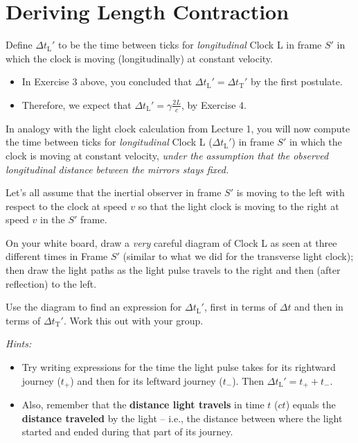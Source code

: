 \documentclass[11pt, letterpaper, openany]{book}
\newenvironment{exercise}[1][Exercise]{%
  \tcolorbox[blanker, breakable, left=1em,
    before skip=1em, after skip=1em,
    borderline west={3pt}{0pt}{PhysNavy},
    colback=PhysCream,
    before upper={\textcolor{PhysNavy}{\sffamily\bfseries #1:}\space}
  ]%
}{%
  \endtcolorbox%
}
\begin{document}
\section{Deriving Length Contraction}

Define $\Delta t_{\text{L}}'$ to be the time between ticks for \textit{longitudinal} Clock L in frame $S'$ in which the clock is moving (longitudinally) at constant velocity.

\begin{itemize}
    \item In Exercise 3 above, you concluded that $\Delta t_{\text{L}}' = \Delta t_{\text{T}}'$ by the first postulate.
    \item Therefore, we expect that $\Delta t_{\text{L}}' = \gamma \frac{2L}{c}$, by Exercise 4.
\end{itemize}

In analogy with the light clock calculation from Lecture 1, you will now compute the time between ticks for \textit{longitudinal} Clock L ($\Delta t_{\text{L}}'$) in frame $S'$ in which the clock is moving at constant velocity, \textit{under the assumption that the observed longitudinal distance between the mirrors stays fixed.}

Let's all assume that the inertial observer in frame $S'$ is moving to the left with respect to the clock at speed $v$ so that the light clock is moving to the right at speed $v$ in the $S'$ frame.

\begin{exercise}[Exercise 5]
On your white board, draw a \textit{very} careful diagram of Clock L as seen at three different times in Frame $S'$ (similar to what we did for the transverse light clock); then draw the light paths as the light pulse travels to the right and then (after reflection) to the left.

Use the diagram to find an expression for $\Delta t_{\text{L}}'$, first in terms of $\Delta t$ and then in terms of $\Delta t_{\text{T}}'$. Work this out with your group.

\textit{Hints:}
\begin{itemize}
    \item Try writing expressions for the time the light pulse takes for its rightward journey ($t_+$) and then for its leftward journey ($t_-$). Then $\Delta t_{\text{L}}' = t_+ + t_-$.
    \item Also, remember that the \textbf{distance light travels} in time $t$ ($ct$) equals the \textbf{distance traveled} by the light -- i.e., the distance between where the light started and ended during that part of its journey.
\end{itemize}
\end{exercise}
\end{document}
